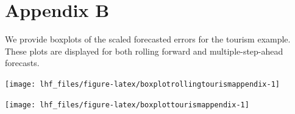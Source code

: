 \documentclass[11pt,a4paper,]{article}
\let\origfigure\figure
\let\endorigfigure\endfigure
\renewenvironment{figure}[1][2] {
    \expandafter\origfigure\expandafter[!htbp]
} {
    \endorigfigure
}
\begin{document}
\clearpage

\hypertarget{appendixB}{%
\section*{Appendix B}\label{appendixB}}

We provide boxplots of the scaled forecasted errors for the tourism
example. These plots are displayed for both rolling forward and
multiple-step-ahead forecasts.

\begin{figure}

{\centering \texttt{[image: lhf\_files/figure-latex/boxplotrollingtourismappendix-1]} 

}

\caption{Box plots of scaled forecast errors from reconciled and unreconciled ETS, ARIMA and OLS methods at each hierarchical level for rolling origin 1-step-ahead tourism demand.}\label{fig:boxplotrollingtourismappendix}
\end{figure}

\begin{figure}

{\centering \texttt{[image: lhf\_files/figure-latex/boxplottourismappendix-1]} 

}

\caption{Box plots of scaled forecast errors from reconciled and unreconciled ETS, ARIMA and OLS methods at each hierarchical level for fixed origin multi-step-ahead tourism demand.}\label{fig:boxplottourismappendix}
\end{figure}

\clearpage

\printbibliography
\end{document}
